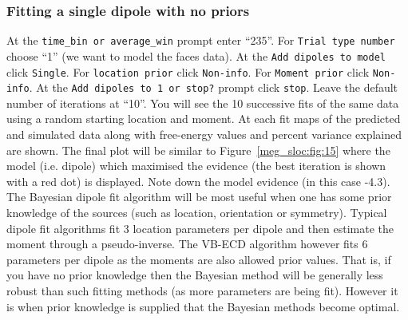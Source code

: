 \subsubsection{Fitting a single dipole with no priors}
At the \texttt{time\_bin or average\_win} prompt enter ``235''. For \texttt{Trial type number} choose ``1'' (we want to model the faces data). At the \texttt{Add dipoles to model} click \texttt{Single}. For \texttt{location prior} click \texttt{Non-info}. For \texttt{Moment prior} click \texttt{Non-info}. At the \texttt{Add dipoles to 1 or stop?} prompt click \texttt{stop}. Leave the default number of iterations at ``10''.
You will see the 10 successive fits of the same data using a random starting location and moment. At each fit maps of the predicted and simulated data along with free-energy values and percent variance explained are shown. The final plot will be similar to Figure~\ref{meg_sloc:fig:15} where the model (i.e. dipole) which maximised the evidence (the best iteration is shown with a red dot) is displayed. Note down the model evidence (in this case -4.3). The Bayesian dipole fit algorithm will be most useful when one has some prior knowledge of the sources (such as location, orientation or symmetry). Typical dipole fit algorithms fit 3 location parameters per dipole and then estimate the moment through a pseudo-inverse. The VB-ECD algorithm however fits 6 parameters per dipole as the moments are also allowed prior values. That is, if you have no prior knowledge then the Bayesian method will be generally less robust than such fitting methods (as more parameters are being fit). However it is when prior knowledge is supplied that the Bayesian methods become optimal.

